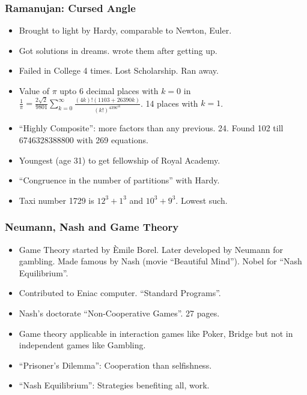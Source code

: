 \begin{frame}[fragile]
\frametitle{Ramanujan: Cursed Angle}
\begin{itemize}[label=\textbullet,noitemsep,nolistsep]
\item Brought to light by Hardy, comparable to Newton, Euler.
\item Got solutions in dreams. wrote them after getting up.
\item Failed in College 4 times. Lost Scholarship. Ran away.
\item Value of $\pi$ upto 6 decimal places with $k=0$ in $\frac{1}{\pi} = \frac{2\sqrt 2}{9801} \sum \limits_{k=0}^{\infty} \frac{(4k)!(1103+26390k)}{(k!)^4396^{4k}}$. 14 places with $k=1$.
\item ``Highly Composite'': more factors than any previous. 24. Found 102 till 6746328388800 with 269 equations.
\item Youngest (age 31) to get fellowship of Royal Academy.
\item ``Congruence in the number of partitions'' with Hardy.
\item Taxi number 1729 is $12^3+1^3$ and  $10^3+9^3$. Lowest such.
\end{itemize}
\end{frame}


\begin{frame}[fragile]
\frametitle{Neumann, Nash and Game Theory}
\begin{itemize}[label=\textbullet,noitemsep,nolistsep]
\item  Game Theory started by \`Emile Borel. Later developed by Neumann for gambling. Made famous by Nash (movie ``Beautiful Mind''). Nobel for ``Nash Equilibrium''.
\item Contributed to Eniac computer. ``Standard Programs''.
\item Nash's doctorate ``Non-Cooperative Games''. 27 pages.
\item Game theory applicable in interaction games like Poker, Bridge but not in independent games like Gambling.
\item ``Prisoner's Dilemma'': Cooperation than selfishness.
\item ``Nash Equilibrium'': Strategies benefiting all, work.
\end{itemize}
\end{frame}

